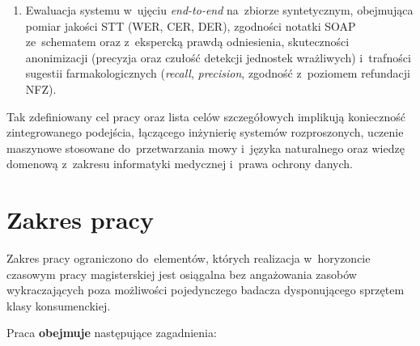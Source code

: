 \begin{enumerate}[label=\textbf{C\arabic*.}, leftmargin=*, itemsep=2pt]
        wyszukiwanie semantyczne w~bazie wiedzy farmakologicznej
        z~zastosowaniem paradygmatu RAG \parencite{lewis2020rag}
        oraz dopasowanie zaleceń terapeutycznych do~aktualnego
        wykazu refundacyjnego NFZ, z~orkiestracją agentów
        zrealizowaną w~bibliotece LangGraph \parencite{langgraph2024}.
  \item Ewaluacja systemu w~ujęciu \emph{end-to-end} na~zbiorze
        syntetycznym, obejmująca pomiar jakości STT (WER, CER, DER),
        zgodności notatki SOAP ze~schematem oraz z~ekspercką prawdą
        odniesienia, skuteczności anonimizacji (precyzja oraz
        czułość detekcji jednostek wrażliwych) i~trafności sugestii
        farmakologicznych (\emph{recall}, \emph{precision},
        zgodność z~poziomem refundacji NFZ).
\end{enumerate}

Tak zdefiniowany cel pracy oraz lista celów szczegółowych implikują
konieczność zintegrowanego podejścia, łączącego inżynierię systemów
rozproszonych, uczenie maszynowe stosowane do~przetwarzania mowy
i~języka naturalnego oraz wiedzę domenową z~zakresu informatyki
medycznej i~prawa ochrony danych.

\section{Zakres pracy}\label{sec:zakres}

Zakres pracy ograniczono do~elementów, których realizacja w~horyzoncie
czasowym pracy magisterskiej jest osiągalna bez angażowania zasobów
wykraczających poza możliwości pojedynczego badacza dysponującego
sprzętem klasy konsumenckiej.

Praca \textbf{obejmuje} następujące zagadnienia:

